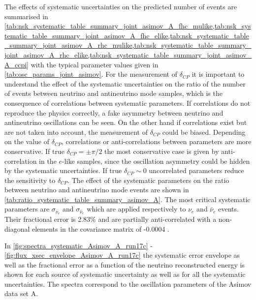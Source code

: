 The effects of systematic uncertainties on the predicted number of events are summarised in 
\cref{tab:nsk_systematic_table_summary_joint_asimov_A_fhc_mulike,tab:nsk_systematic_table_summary_joint_asimov_A_fhc_elike,tab:nsk_systematic_table_summary_joint_asimov_A_rhc_mulike,tab:nsk_systematic_table_summary_joint_asimov_A_rhc_elike,tab:nsk_systematic_table_summary_joint_asimov_A_ccpi} 
with the typical parameter values given in \cref{tab:osc_params_joint_asimov}.
For the measurement of $\delta_{CP}$ it is important to understand the effect of the systematic uncertainties
on the ratio of the number of events between neutrino and antineutrino mode samples,
which is the consequence of correlations between systematic parameters.
If correlations do not reproduce the physics correctly, a fake asymmetry between neutrino and antineutrino oscillations can be seen.
On the other hand if correlations exist but are not taken into account, the measurement of $\delta_{CP}$ could be biased.
Depending on the value of $\delta_{CP}$, correlations or anti-correlations between parameters are more conservative.
If true $\delta_{CP} = \pm \pi/2$ the most conservative case is given by anti-correlation in the $e$-like samples, 
since the oscillation asymmetry could be hidden by the systematic uncertainties.
If true $\delta_{CP} \sim 0$ uncorrelated parameters reduce the sensitivity to $\delta_{CP}$.
The effect of the systematic parameters on the ratio between neutrino and antineutrino mode events are shown in 
\cref{tab:ratio_systematic_table_summary_asimov_A}.
The most critical systematic parameters are $\sigma_{\nu_e}$ and $\sigma_{\bar{\nu}_e}$
which are applied respectively to $\nu_e$ and $\bar{\nu}_e$ events.
Their fractional error is 2.83\%
and are partially anti-correlated with a non-diagonal elements in the covariance matrix of -0.0004 
\cite{NIWG_reccomandation}.





\clearpage



In \cref{fig:spectra_systematic_Asimov_A_run17c} - \ref{fig:flux_xsec_envelope_Asimov_A_run17c}
the systematic error envelope as well as the fractional error as a function of the
neutrino reconstructed energy is shown for each source of systematic uncertainty
as well as for all the systematic uncertainties. 
The spectra correspond to the oscillation parameters of the Asimov data set A.

